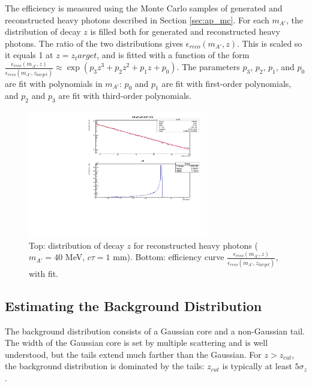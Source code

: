 The efficiency is measured using the Monte Carlo samples of generated and reconstructed heavy photons described in Section \ref{sec:ap_mc}.
For each $m_{A'}$, the distribution of decay $z$ is filled both for generated and reconstructed heavy photons.
The ratio of the two distributions gives $\epsilon_{reco}(m_{A'},z)$.
This is scaled so it equals 1 at $z=z_target$, and is fitted with a function of the form $\frac{\epsilon_{reco}(m_{A'},z)}{\epsilon_{reco}(m_{A'},z_{target})} \approx \exp(p_3 z^3 + p_2 z^2 + p_1 z + p_0)$.
The parameters $p_3$, $p_2$, $p_1$, and $p_0$ are fit with polynomials in $m_{A'}$: $p_0$ and $p_1$ are fit with first-order polynomials, and $p_2$ and $p_3$ are fit with third-order polynomials.

\begin{figure}[ht]
\begin{center}
    \includegraphics[width=0.7\textwidth,page=2,angle=-90]{vertexing/figs/acceptance_40}
\end{center}
    \caption{Top: distribution of decay $z$ for reconstructed heavy photons ($m_{A'}=40$ MeV, $c\tau=1$ mm). Bottom: efficiency curve $\frac{\epsilon_{reco}(m_{A'},z)}{\epsilon_{reco}(m_{A'},z_{target})}$, with fit.}
    \label{fig:eff_z}
\end{figure}

\subsection{Estimating the Background Distribution}
\label{sec:tails}
The background distribution consists of a Gaussian core and a non-Gaussian tail.
The width of the Gaussian core is set by multiple scattering and is well understood, but the tails extend much farther than the Gaussian.
For $z>z_{cut}$, the background distribution is dominated by the tails: $z_{cut}$ is typically at least $5\sigma_z$.

